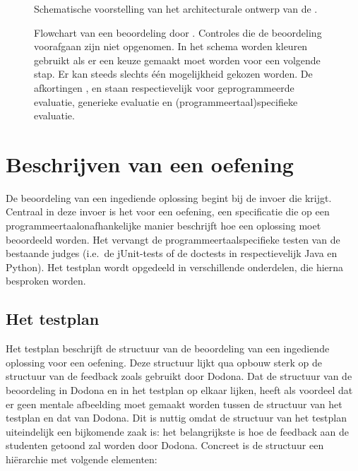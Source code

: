 \begin{figure}
    \centering
    
    \caption{Schematische voorstelling van het architecturale ontwerp van de \tested{}.}
    \label{fig:universal-judge}
\end{figure}

\begin{figure}
    \centering
    
    \caption{
        Flowchart van een beoordeling door \tested{}.
        Controles die de beoordeling voorafgaan zijn niet opgenomen.
        In het schema worden kleuren gebruikt als er een keuze gemaakt moet worden voor een volgende stap.
        Er kan steeds slechts één mogelijkheid gekozen worden.
        De afkortingen ,  en  staan respectievelijk voor geprogrammeerde evaluatie, generieke evaluatie en (programmeertaal)specifieke evaluatie.
    }
    \label{fig:tested-flow}
\end{figure}


\section{Beschrijven van een oefening}\label{sec:testplan}

De beoordeling van een ingediende oplossing begint bij de invoer die \tested{} krijgt.
Centraal in deze invoer is het  voor een oefening, een specificatie die op een programmeertaalonafhankelijke manier beschrijft hoe een oplossing moet beoordeeld worden.
Het vervangt de programmeertaalspecifieke testen van de bestaande judges (i.e.\ de jUnit-tests of de doctests in respectievelijk Java en Python).
Het testplan  wordt opgedeeld in verschillende onderdelen, die hierna besproken worden.

\subsection{Het testplan}\label{subsec:het-testplan}

Het testplan  beschrijft de structuur van de beoordeling van een ingediende oplossing voor een oefening.
Deze structuur lijkt qua opbouw sterk op de structuur van de feedback zoals gebruikt door Dodona.
Dat de structuur van de beoordeling in Dodona en in het testplan op elkaar lijken, heeft als voordeel dat er geen mentale afbeelding moet gemaakt worden tussen de structuur van het testplan en dat van Dodona.
Dit is nuttig omdat de structuur van het testplan uiteindelijk een bijkomende zaak is: het belangrijkste is hoe de feedback aan de studenten getoond zal worden door Dodona.
Concreet is de structuur een hiërarchie met volgende elementen:

